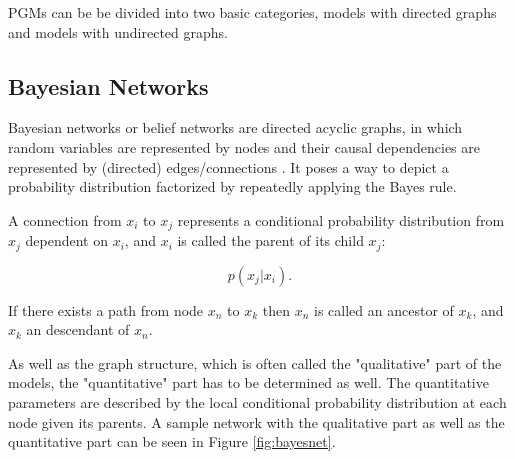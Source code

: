 PGMs can be be divided into two basic categories, models with directed graphs and models with undirected graphs.


\subsection{Bayesian Networks} \label{c:bayesnet}

Bayesian networks or belief networks are directed acyclic graphs, in which random variables are represented by nodes and their causal dependencies are represented by (directed) edges/connections \cite{Faltin2007} \cite{Goodfellow-et-al-2016-Book}. 
It poses a way to depict a probability distribution factorized by repeatedly applying the Bayes rule.

A connection from $x_i$ to $x_j$ represents a conditional probability distribution from $x_j$ dependent on $x_i$, and $x_i$ is called the parent of its child $x_j$:

\[
p(x_j | x_i) .
\]


If there exists a path from node $x_n$ to $x_k$ then $x_n$ is called an ancestor of $x_k$, and $x_k$ an descendant of $x_n$. 

As well as the graph structure, which is often called the "qualitative" part of the models, the "quantitative" part has to be determined as well.
The quantitative parameters are described by the local conditional probability distribution at each node given its parents.
A sample network with the qualitative part as well as the quantitative part can be seen in Figure \ref{fig:bayesnet}. 

